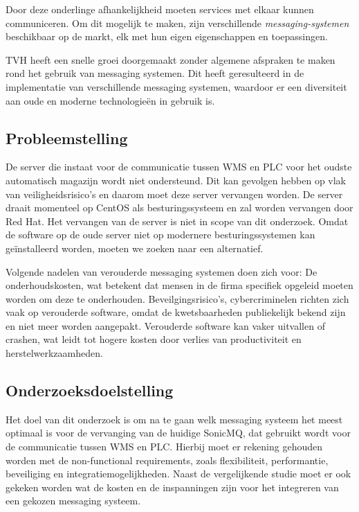 Door deze onderlinge afhankelijkheid moeten services met elkaar kunnen communiceren. 
Om dit mogelijk te maken, zijn verschillende \emph{messaging-systemen} beschikbaar op de markt, 
elk met hun eigen eigenschappen en toepassingen.
\newline 

TVH heeft een snelle groei doorgemaakt zonder algemene afspraken te maken rond het gebruik van messaging systemen. 
Dit heeft geresulteerd in de implementatie van verschillende messaging systemen, waardoor er een diversiteit aan oude en moderne technologieën in gebruik is. 
\newline 

\subsection{Probleemstelling}
De server die instaat voor de communicatie tussen WMS en PLC voor het oudste automatisch magazijn wordt niet ondersteund.
Dit kan gevolgen hebben op vlak van veiligheidsrisico's en daarom moet deze server vervangen worden.
De server draait momenteel op CentOS als besturingssysteem en zal worden vervangen door Red Hat.
Het vervangen van de server is niet in scope van dit onderzoek. 
Omdat de software op de oude server niet op modernere besturingssystemen kan geïnstalleerd worden, 
moeten we zoeken naar een alternatief.
\newline

Volgende nadelen van verouderde messaging systemen doen zich voor: 
De onderhoudskosten, wat betekent dat mensen in de firma specifiek opgeleid moeten worden om deze te onderhouden. 
Beveilgingsrisico's, cybercriminelen richten zich vaak op verouderde software, omdat de kwetsbaarheden publiekelijk bekend zijn en niet meer worden aangepakt.
Verouderde software kan vaker uitvallen of crashen, wat leidt tot hogere kosten door verlies van productiviteit en herstelwerkzaamheden.
\newline 

\subsection{Onderzoeksdoelstelling}
Het doel van dit onderzoek is om na te gaan welk messaging systeem het meest optimaal is voor de vervanging van de huidige SonicMQ,
dat gebruikt wordt voor de communicatie tussen WMS en PLC. 
Hierbij moet er rekening gehouden worden met de non-functional requirements,
zoals flexibiliteit, performantie, beveiliging en integratiemogelijkheden.
Naast de vergelijkende studie moet er ook gekeken worden wat de kosten en de inspanningen zijn 
voor het integreren van een gekozen messaging systeem. \newline 

